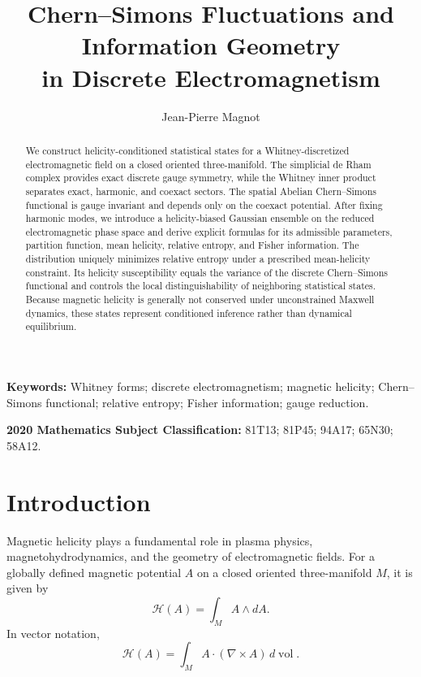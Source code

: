 \documentclass[11pt]{article}
\title{
Chern--Simons Fluctuations and Information Geometry\\
in Discrete Electromagnetism
}
\author{
Jean-Pierre Magnot
}
\date{}
\theoremstyle{definition}
\theoremstyle{remark}
\begin{document}
\maketitle


\begin{abstract}
We construct helicity-conditioned statistical states for a
Whitney-discretized electromagnetic field on a closed oriented
three-manifold. The simplicial de Rham complex provides exact
discrete gauge symmetry, while the Whitney inner product separates
exact, harmonic, and coexact sectors. The spatial Abelian
Chern--Simons functional is gauge invariant and depends only on the
coexact potential. After fixing harmonic modes, we introduce a
helicity-biased Gaussian ensemble on the reduced electromagnetic
phase space and derive explicit formulas for its admissible
parameters, partition function, mean helicity, relative entropy,
and Fisher information. The distribution uniquely minimizes
relative entropy under a prescribed mean-helicity constraint.
Its helicity susceptibility equals the variance of the discrete
Chern--Simons functional and controls the local distinguishability
of neighboring statistical states. Because magnetic helicity is
generally not conserved under unconstrained Maxwell dynamics, these
states represent conditioned inference rather than dynamical
equilibrium.
\end{abstract}


\medskip

\noindent
\textbf{Keywords:}
Whitney forms; discrete electromagnetism; magnetic helicity;
Chern--Simons functional; relative entropy; Fisher information;
gauge reduction.
\medskip

\noindent
\textbf{2020 Mathematics Subject Classification:}
81T13; 81P45; 94A17; 65N30; 58A12.
\section{Introduction}

Magnetic helicity plays a fundamental role in plasma physics,
magnetohydrodynamics, and the geometry of electromagnetic fields.
For a globally defined magnetic potential \(A\) on a closed
oriented three-manifold \(M\), it is given by
\begin{equation}
\mathscr H(A)
=
\int_M A\wedge dA.
\label{eq:continuous-helicity}
\end{equation}
In vector notation,
\begin{equation}
\mathscr H(A)
=
\int_M
A\cdot(\nabla\times A)\,d\operatorname{vol}.
\label{eq:vector-helicity}
\end{equation}
\end{document}
